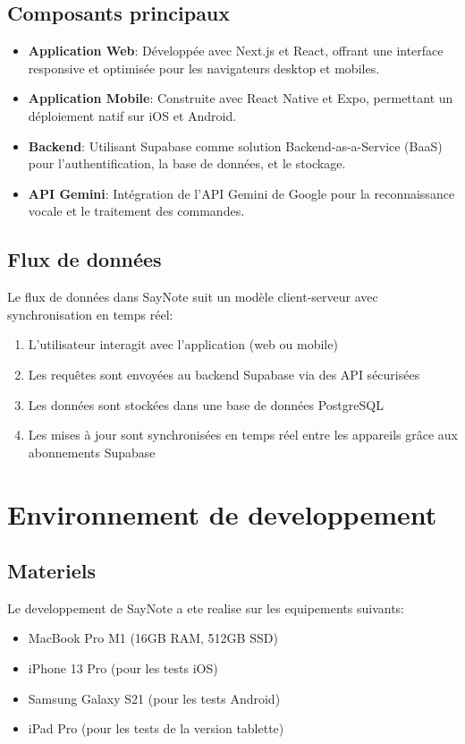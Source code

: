 \subsection{Composants principaux}
\begin{itemize}
    \item \textbf{Application Web}: Développée avec Next.js et React, offrant une interface responsive et optimisée pour les navigateurs desktop et mobiles.
    \item \textbf{Application Mobile}: Construite avec React Native et Expo, permettant un déploiement natif sur iOS et Android.
    \item \textbf{Backend}: Utilisant Supabase comme solution Backend-as-a-Service (BaaS) pour l'authentification, la base de données, et le stockage.
    \item \textbf{API Gemini}: Intégration de l'API Gemini de Google pour la reconnaissance vocale et le traitement des commandes.
\end{itemize}

\subsection{Flux de données}
Le flux de données dans SayNote suit un modèle client-serveur avec synchronisation en temps réel:
\begin{enumerate}
    \item L'utilisateur interagit avec l'application (web ou mobile)
    \item Les requêtes sont envoyées au backend Supabase via des API sécurisées
    \item Les données sont stockées dans une base de données PostgreSQL
    \item Les mises à jour sont synchronisées en temps réel entre les appareils grâce aux abonnements Supabase
\end{enumerate}

\section{Environnement de developpement}
\subsection{Materiels}
Le developpement de SayNote a ete realise sur les equipements suivants:
\begin{itemize}
    \item MacBook Pro M1 (16GB RAM, 512GB SSD)
    \item iPhone 13 Pro (pour les tests iOS)
    \item Samsung Galaxy S21 (pour les tests Android)
    \item iPad Pro (pour les tests de la version tablette)
\end{itemize}

